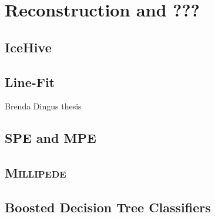 \chapter{Reconstruction and ???}
\section{IceHive}
\section{Line-Fit}
Brenda Dingus thesis
\section{SPE and MPE}
\section{\textsc{Millipede}}
\section{Boosted Decision Tree Classifiers}